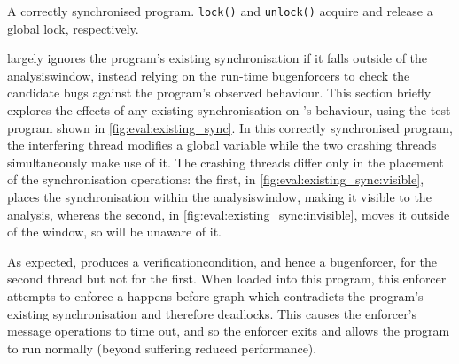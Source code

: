 \begin{sanefig}
{{    }
    \hspace{3mm}
    \label{fig:eval:existing_sync:invisible}
  }
  \hspace{-3mm}
  \hfill
  \hspace{-3mm}
  \vspace{-12pt}
  \caption{A correctly synchronised program.  \texttt{lock()} and
    \texttt{unlock()} acquire and release a global lock,
    respectively.}
  \label{fig:eval:existing_sync}
\end{sanefig}

{\Technique} largely ignores the program's existing synchronisation if
it falls outside of the \gls{analysiswindow}, instead relying on the
run-time \glspl{bugenforcer} to check the candidate bugs against the
program's observed behaviour.  This section briefly explores the
effects of any existing synchronisation on {\technique}'s behaviour,
using the test program shown in \autoref{fig:eval:existing_sync}.  In
this correctly synchronised program, the interfering thread modifies a
global variable while the two crashing threads simultaneously make use
of it.  The crashing threads differ only in the placement of the
synchronisation operations: the first, in
\autoref{fig:eval:existing_sync:visible}, places the synchronisation
within the \gls{analysiswindow}, making it visible to the {\technique}
analysis, whereas the second, in
\autoref{fig:eval:existing_sync:invisible}, moves it outside of the
window, so {\technique} will be unaware of it.

As expected, {\technique} produces a \gls{verificationcondition}, and
hence a \gls{bugenforcer}, for the second thread but not for the
first.  When loaded into this program, this enforcer attempts to
enforce a happens-before graph which contradicts the program's
existing synchronisation and therefore deadlocks.  This causes the
enforcer's message operations to time out, and so the enforcer exits
and allows the program to run normally (beyond suffering reduced
performance).

